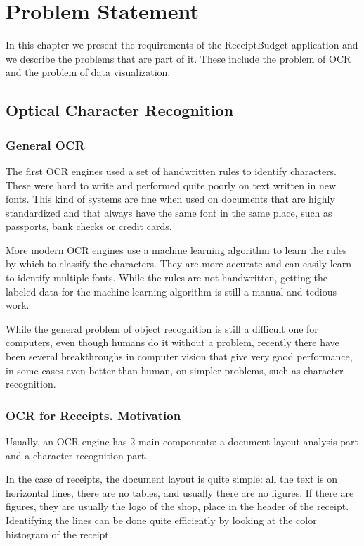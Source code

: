 \chapter{Problem Statement}
\label{chap:statement}

In this chapter we present the requirements of the ReceiptBudget application and we describe the problems that are part of it. These include the problem of OCR and the problem of data visualization.

\section{Optical Character Recognition}
\subsection{General OCR}

The first OCR engines used a set of handwritten rules to identify characters\cite{shepard1971reading}. These were hard to write and performed quite poorly on text written in new fonts. This kind of systems are fine when used on documents that are highly standardized and that always have the same font in the same place, such as passports, bank checks or credit cards. 

More modern OCR engines use a machine learning algorithm to learn the rules by which to classify the characters\cite{smith2007overview}. They are more accurate and can easily learn to identify multiple fonts. While the rules are not handwritten, getting the labeled data for the machine learning algorithm is still a manual and tedious work. 

While the general problem of object recognition is still a difficult one for computers, even though humans do it without a problem, recently there have been several breakthroughs in computer vision that give very good performance, in some cases even better than human, on simpler problems, such as character recognition. 

\subsection{OCR for Receipts. Motivation}
Usually, an OCR engine has 2 main components: a document layout analysis part and a character recognition part. 

In the case of receipts, the document layout is quite simple: all the text is on horizontal lines, there are no tables, and usually there are no figures. If there are figures, they are usually the logo of the shop, place in the header of the receipt. Identifying the lines can be done quite efficiently by looking at the color histogram of the receipt. 

